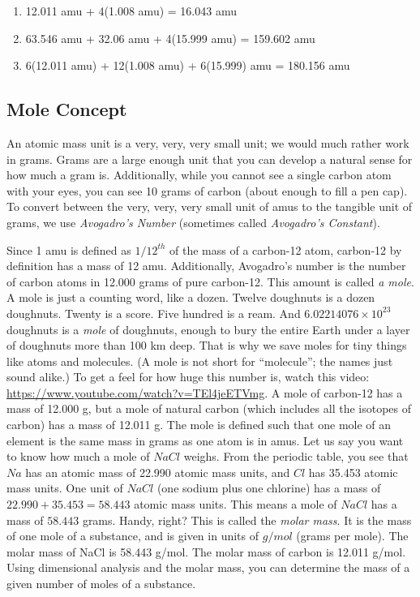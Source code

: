 \begin{Answer}[ref = molecular]
\begin{enumerate}
\item 12.011 amu + 4(1.008 amu) = 16.043 amu
\item 63.546 amu + 32.06 amu + 4(15.999 amu) = 159.602 amu
\item 6(12.011 amu) + 12(1.008 amu) + 6(15.999) amu = 180.156 amu
\end{enumerate}
\end{Answer}

\subsection{Mole Concept}

An atomic mass unit is a very, very, very small unit; we would much rather work in
grams. Grams are a large enough unit that you can develop a natural sense for how 
much a gram is. Additionally, while you cannot see a single carbon atom with your 
eyes, you can see 10 grams of carbon (about enough to fill a pen cap). To convert
between the very, very, very small unit of amus to the tangible unit of grams, we 
use \textit{Avogadro's Number} (sometimes called \textit{Avogadro's Constant}).

Since 1 amu is defined as $1/12^{th}$ of the mass of a carbon-12 atom, carbon-12 
by definition has a mass of 12 amu. Additionally, Avogadro's number is the number 
of carbon atoms in 12.000 grams of pure carbon-12. This amount is called \textit{a
mole}. A mole is just a counting word, like a dozen. Twelve doughnuts is a dozen doughnuts. Twenty is a score. Five hundred is a ream. And $6.02214076 
\times 10^{23}$ doughnuts is a \textit{mole} of doughnuts, enough to bury the entire Earth under a layer of doughnuts more than 100 km deep. That is why we save moles for tiny things like atoms and molecules. (A mole is not short for ``molecule''; the names just sound alike.) To get a feel for how huge this number is, watch this video: 
\url{https://www.youtube.com/watch?v=TEl4jeETVmg}. 
A mole of carbon-12 has a mass of 12.000 g, but a mole of natural carbon (which
includes all the isotopes of carbon) has a mass of 12.011 g. The mole is defined 
such that one mole of an element is the same mass in grams as one atom is in amus.
Let us say you want to know how much a mole of $NaCl$ weighs. From the periodic 
table, you see that $Na$ has an atomic mass of 22.990 atomic mass units, and $Cl$ 
has 35.453 atomic mass units. One unit of $NaCl$ (one sodium plus one chlorine) has a mass of $22.990 + 35.453 = 
58.443$ atomic mass units. This means a mole of $NaCl$ has a mass of $58.443$ 
grams. Handy, right? This is called the \textit{molar mass}. It is the mass of one
mole of a substance, and is given in units of $g/mol$ (grams per mole). The molar 
mass of NaCl is 58.443 g/mol. The molar mass of carbon is 12.011 g/mol. Using 
dimensional analysis and the molar mass, you can determine the mass of a given 
number of moles of a substance. 

